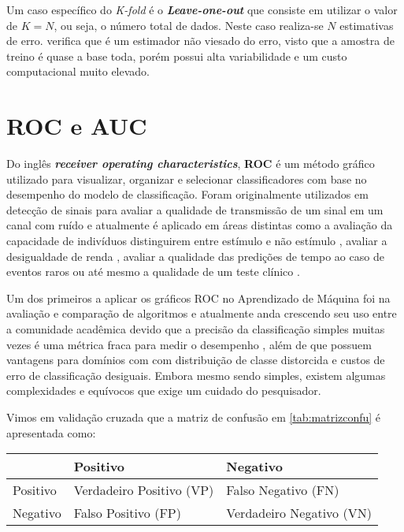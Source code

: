 \documentclass[
  openany]{book}
\begin{document}
Um caso específico do \emph{K-fold} é o \textbf{\emph{Leave-one-out}} que consiste em utilizar o valor de \(K=N\), ou seja, o número total de dados. Neste caso realiza-se \(N\) estimativas de erro. \citet{borra2010measuring} verifica que é um estimador não viesado do erro, visto que a amostra de treino é quase a base toda, porém possui alta variabilidade e um custo computacional muito elevado.

\hypertarget{aocroc}{%
\section{ROC e AUC}\label{aocroc}}

Do inglês \textbf{\emph{receiver operating characteristics}}, \textbf{ROC} é um método gráfico utilizado para visualizar, organizar e selecionar classificadores com base no desempenho do modelo de classificação. Foram originalmente utilizados em detecção de sinais para avaliar a qualidade de transmissão de um sinal em um canal com ruído \citep{egan1975signal} e atualmente é aplicado em áreas distintas como a avaliação da capacidade de indivíduos distinguirem entre estímulo e não estímulo \citep{green1966signal}, avaliar a desigualdade de renda \citep{gastwirth1971general}, avaliar a qualidade das predições de tempo ao caso de eventos raros ou até mesmo a qualidade de um teste clínico \citep{zhou2009statistical, mylne2002decision}.

Um dos primeiros a aplicar os gráficos ROC no Aprendizado de Máquina foi \citep{spackman1989signal} na avaliação e comparação de algoritmos e atualmente anda crescendo seu uso entre a comunidade acadêmica devido que a precisão da classificação simples muitas vezes é uma métrica fraca para medir o desempenho \citep{provost1997analysis}, além de que possuem vantagens para domínios com com distribuição de classe distorcida e custos de erro de classificação desiguais. Embora mesmo sendo simples, existem algumas complexidades e equívocos que exige um cuidado do pesquisador.

Vimos em validação cruzada que a matriz de confusão em \ref{tab:matrizconfu} é apresentada como:

\begin{longtable}[]{@{}lll@{}}
\toprule
& Positivo & Negativo\tabularnewline
\midrule
\endhead
Positivo & Verdadeiro Positivo (VP) & Falso Negativo (FN)\tabularnewline
Negativo & Falso Positivo (FP) & Verdadeiro Negativo (VN)\tabularnewline
\bottomrule
\end{longtable}
\end{document}
